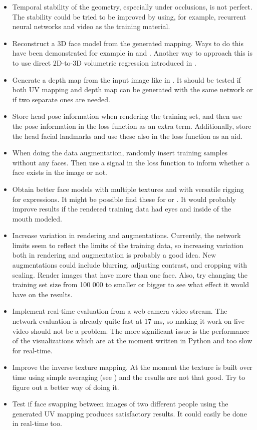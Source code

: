 \begin{itemize}
    \item Temporal stability of the geometry, especially under occlusions, is not perfect. The stability could be tried to be improved by using, for example, recurrent neural networks and video as the training material.
    \item Reconstruct a 3D face model from the generated mapping. Ways to do this have been demonstrated for example in \cite{Sela2017} and \cite{Richardson2016}. Another way to approach this is to use direct 2D-to-3D volumetric regression introduced in \cite{Jackson2017}.
    \item Generate a depth map from the input image like in \cite{Sela2017}. It should be tested if both UV mapping and depth map can be generated with the same network or if two separate ones are needed.
    \item Store head pose information when rendering the training set, and then use the pose information in the loss function as an extra term. Additionally, store the head facial landmarks and use these also in the loss function as an aid.
    \item When doing the data augmentation, randomly insert training samples without any faces. Then use a signal in the loss function to inform whether a face exists in the image or not.
    \item Obtain better face models with multiple textures and with versatile rigging for expressions. It might be possible find these for \textcite{unreal} or \textcite{unity}. It would probably improve results if the rendered training data had eyes and inside of the mouth modeled.
    \item Increase variation in rendering and augmentations. Currently, the network limits seem to reflect the limits of the training data, so increasing variation both in rendering and augmentation is probably a good idea. New augmentations could include blurring, adjusting contrast, and cropping with scaling. Render images that have more than one face. Also, try changing the training set size from 100 000 to smaller or bigger to see what effect it would have on the results.
    \item Implement real-time evaluation from a web camera video stream. The network evaluation is already quite fast at 17 ms, so making it work on live video should not be a problem. The more significant issue is the performance of the visualizations which are at the moment written in Python and too slow for real-time.
    \item Improve the inverse texture mapping. At the moment the texture is built over time using simple averaging (see \cite{uvnet}) and the results are not that good. Try to figure out a better way of doing it.
    \item Test if face swapping between images of two different people using the generated UV mapping produces satisfactory results. It could easily be done in real-time too.
\end{itemize}

